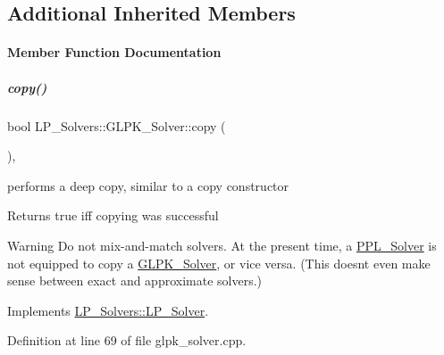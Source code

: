 \subsection*{Additional Inherited Members}


\paragraph{Member Function Documentation}
\mbox{\label{group___c_l_s_solvers_a43a745172366a1dfd893dee00f0ce0fb}} 
\subparagraph{\texorpdfstring{copy()}{copy()}}
{\footnotesize\ttfamily bool L\+P\+\_\+\+Solvers\+::\+G\+L\+P\+K\+\_\+\+Solver\+::copy (\begin{DoxyParamCaption}\item[{const \hyperlink{group___c_l_s_solvers_class_l_p___solvers_1_1_l_p___solver}{L\+P\+\_\+\+Solver} $\ast$}]{ }\end{DoxyParamCaption})\hspace{0.3cm}{\ttfamily [override]}, {\ttfamily [virtual]}}



performs a deep copy, similar to a copy constructor 

\begin{DoxyReturn}{Returns}
{\ttfamily true} iff copying was successful 
\end{DoxyReturn}
\begin{DoxyWarning}{Warning}
Do not mix-\/and-\/match solvers. At the present time, a \hyperlink{group___c_l_s_solvers_class_l_p___solvers_1_1_p_p_l___solver}{P\+P\+L\+\_\+\+Solver} is not equipped to copy a \hyperlink{group___c_l_s_solvers_class_l_p___solvers_1_1_g_l_p_k___solver}{G\+L\+P\+K\+\_\+\+Solver}, or vice versa. (This doesn\textquotesingle{}t even make sense between exact and approximate solvers.) 
\end{DoxyWarning}


Implements \hyperlink{group___c_l_s_solvers_a36c14a88e9d3ae9d9321acc7877236d0}{L\+P\+\_\+\+Solvers\+::\+L\+P\+\_\+\+Solver}.



Definition at line 69 of file glpk\+\_\+solver.\+cpp.

